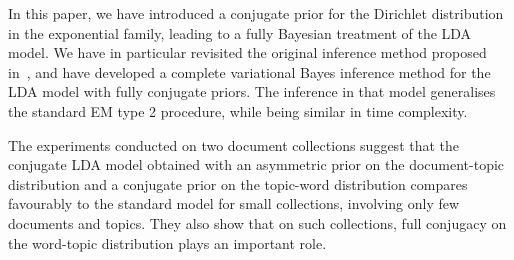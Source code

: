 In this paper, we have introduced a conjugate prior for the Dirichlet distribution in the exponential family, leading to a fully Bayesian treatment of the LDA model. We have in particular revisited the original inference method proposed in~\cite{blei_latent_2003}, and have developed a complete variational Bayes inference method for the LDA model with fully conjugate priors. The inference in that model generalises the standard EM type 2 procedure, while being similar in time complexity.

The experiments conducted on two document collections suggest that the conjugate LDA model obtained with an asymmetric prior on the document-topic distribution and a conjugate prior on the topic-word distribution compares favourably to the standard model for small collections, involving only few documents and topics. They also show that on such collections, full conjugacy on the word-topic distribution plays an important role.
 